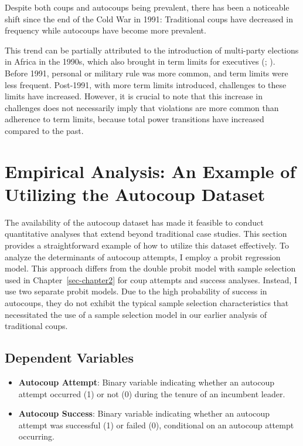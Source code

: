 \documentclass[
  12pt,
]{report}
\begin{document}
Despite both coups and autocoups being prevalent, there has been a
noticeable shift since the end of the Cold War in 1991: Traditional
coups have decreased in frequency while autocoups have become more
prevalent.

This trend can be partially attributed to the introduction of
multi-party elections in Africa in the 1990s, which also brought in term
limits for executives (;
). Before 1991, personal or
military rule was more common, and term limits were less frequent.
Post-1991, with more term limits introduced, challenges to these limits
have increased. However, it is crucial to note that this increase in
challenges does not necessarily imply that violations are more common
than adherence to term limits, because total power transitions have
increased compared to the past.

\section{Empirical Analysis: An Example of Utilizing the Autocoup
Dataset}\label{empirical-analysis-an-example-of-utilizing-the-autocoup-dataset}

The availability of the autocoup dataset has made it feasible to conduct
quantitative analyses that extend beyond traditional case studies. This
section provides a straightforward example of how to utilize this
dataset effectively. To analyze the determinants of autocoup attempts, I
employ a probit regression model. This approach differs from the double
probit model with sample selection used in Chapter~\ref{sec-chapter2}
for coup attempts and success analyses. Instead, I use two separate
probit models. Due to the high probability of success in autocoups, they
do not exhibit the typical sample selection characteristics that
necessitated the use of a sample selection model in our earlier analysis
of traditional coups.

\subsection{Dependent Variables}\label{dependent-variables}

\begin{itemize}
\item
  \textbf{Autocoup Attempt}: Binary variable indicating whether an
  autocoup attempt occurred (1) or not (0) during the tenure of an
  incumbent leader.
\item
  \textbf{Autocoup Success}: Binary variable indicating whether an
  autocoup attempt was successful (1) or failed (0), conditional on an
  autocoup attempt occurring.
\end{itemize}
\end{document}
